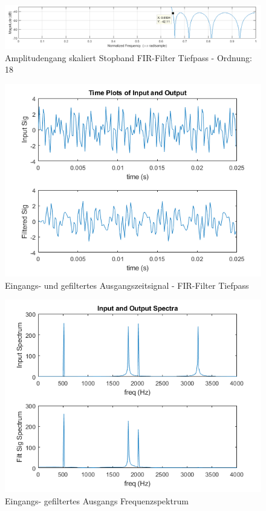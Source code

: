\begin{figure}[H]
	\centering
	\includegraphics[width=1.0\linewidth]{Bilder/Attachment_A2_fir_2b_Amplitudengang_StopBand_19K}
	\caption{Amplitudengang skaliert Stopband FIR-Filter Tiefpass - Ordnung: 18}
	\label{fig:Attachment_A2_fir_2b_Amplitudengang_StopBand_19K}
\end{figure}



\newpage


\begin{figure}[H]
\centering
\includegraphics[width=0.85\linewidth]{./Bilder/Attachment_A2_fir_2b_Timeplot}
\caption{Eingangs- und gefiltertes Ausgangszeitsignal  - FIR-Filter Tiefpass}
\label{fig:Attachment_A2_fir_2b_Timeplot}
\end{figure}

\begin{figure}[H]
\centering
\includegraphics[width=0.85\linewidth]{./Bilder/Attachment_A2_fir_2b_Spektrum}
\caption{Eingangs- gefiltertes Ausgangs Frequenzspektrum}
\label{fig:Attachment_A2_fir_2b_Spektrum}
\end{figure}


